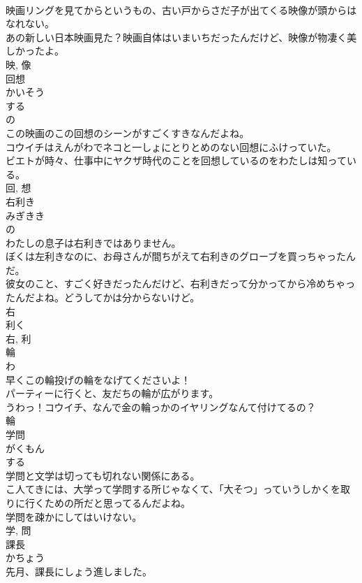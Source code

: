 \documentclass[8pt]{extreport}
\begin{document}
\begin{CJK}{UTF8}{min}
\\	映画リングを見てからというもの、古い戸からさだ子が出てくる映像が頭からはなれない。	
\\	あの新しい日本映画見た？映画自体はいまいちだったんだけど、映像が物凄く美しかったよ。	
\\	映, 像	
\\	回想	
\\	かいそう	
\\	する 
\\	の 
\\	この映画のこの回想のシーンがすごくすきなんだよね。	
\\	コウイチはえんがわでネコと一しょにとりとめのない回想にふけっていた。	
\\	ビエトが時々、仕事中にヤクザ時代のことを回想しているのをわたしは知っている。	
\\	回, 想	
\\	右利き	
\\	みぎきき	
\\	の 
\\	わたしの息子は右利きではありません。	
\\	ぼくは左利きなのに、お母さんが間ちがえて右利きのグローブを買っちゃったんだ。	
\\	彼女のこと、すごく好きだったんだけど、右利きだって分かってから冷めちゃったんだよね。どうしてかは分からないけど。	
\\	右 
\\	利く 
\\	右, 利	
\\	輪	
\\	わ	
\\	早くこの輪投げの輪をなげてくださいよ！	
\\	パーティーに行くと、友だちの輪が広がります。	
\\	うわっ！コウイチ、なんで金の輪っかのイヤリングなんて付けてるの？	
\\	輪	
\\	学問	
\\	がくもん	
\\	する 
\\	学問と文学は切っても切れない関係にある。	
\\	こ人てきには、大学って学問する所じゃなくて、「大そつ」っていうしかくを取りに行くための所だと思ってるんだよね。	
\\	学問を疎かにしてはいけない。	
\\	学, 問	
\\	課長	
\\	かちょう	
\\	先月、課長にしょう進しました。	

\end{CJK}
\end{document}
